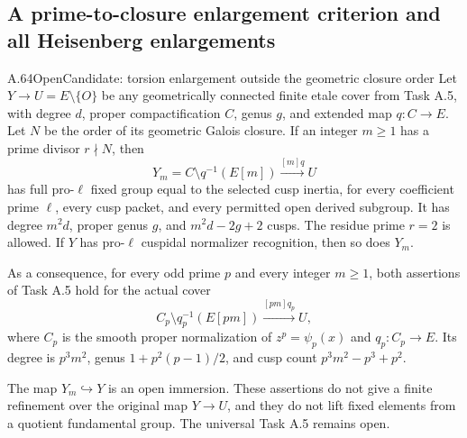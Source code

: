 \subsection{A prime-to-closure enlargement criterion and all Heisenberg enlargements}

\begin{statement}{A.64}{Open}{Candidate: torsion enlargement outside the geometric closure order}
Let \(Y\to U=E\setminus\{O\}\) be any geometrically
connected finite etale cover from Task A.5, with degree
\(d\), proper compactification \(C\), genus \(g\), and
extended map \(q:C\to E\). Let \(N\) be the order of
its geometric Galois closure. If an integer \(m\ge1\)
has a prime divisor \(r\nmid N\), then
\[
 Y_m=C\setminus q^{-1}(E[m])
                \xrightarrow{[m]q}U                   \tag{A.64.1}
\]
has full pro-\(\ell\) fixed group equal to the selected
cusp inertia, for every coefficient prime \(\ell\),
every cusp packet, and every permitted open derived
subgroup. It has degree \(m^2d\), proper genus \(g\),
and \(m^2d-2g+2\) cusps. The residue prime \(r=2\)
is allowed. If \(Y\) has pro-\(\ell\) cuspidal
normalizer recognition, then so does \(Y_m\).

As a consequence, for every odd prime \(p\) and every
integer \(m\ge1\), both assertions of Task A.5 hold
for the actual cover
\[
 C_p\setminus q_p^{-1}(E[pm])
                  \xrightarrow{[pm]q_p}U,             \tag{A.64.2}
\]
where \(C_p\) is the smooth proper normalization of
\(z^p=\psi_p(x)\) and \(q_p:C_p\to E\).
Its degree is \(p^3m^2\), genus
\(1+p^2(p-1)/2\), and cusp count
\(p^3m^2-p^3+p^2\).

The map \(Y_m\hookrightarrow Y\) is an open immersion.
These assertions do not give a finite refinement over the
original map \(Y\to U\), and they do not lift fixed
elements from a quotient fundamental group. The universal
Task A.5 remains open.
\end{statement}

